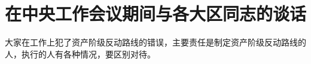 \section[在中央工作会议期间与各大区同志的谈话（一九六六年十月）]{在中央工作会议期间与各大区同志的谈话}


大家在工作上犯了资产阶级反动路线的错误，主要责任是制定资产阶级反动路线的人，执行的人有各种情况，要区别对待。

